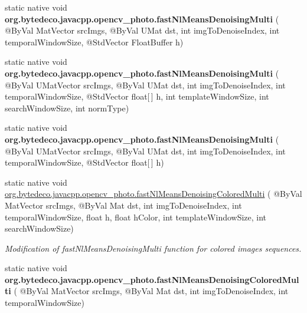 \begin{DoxyCompactItemize}
\item 
\mbox{\label{group__photo__denoise_ga57df66e4f40de8a8d16324a48812dc5b}} 
static native void {\bfseries org.\+bytedeco.\+javacpp.\+opencv\+\_\+photo.\+fast\+Nl\+Means\+Denoising\+Multi} ( @By\+Val Mat\+Vector src\+Imgs, @By\+Val U\+Mat dst, int img\+To\+Denoise\+Index, int temporal\+Window\+Size, @Std\+Vector Float\+Buffer h)
\item 
\mbox{\label{group__photo__denoise_ga8c1f5873e900c7cb05bab2bc1c24648d}} 
static native void {\bfseries org.\+bytedeco.\+javacpp.\+opencv\+\_\+photo.\+fast\+Nl\+Means\+Denoising\+Multi} ( @By\+Val U\+Mat\+Vector src\+Imgs, @By\+Val U\+Mat dst, int img\+To\+Denoise\+Index, int temporal\+Window\+Size, @Std\+Vector float\mbox{[}$\,$\mbox{]} h, int template\+Window\+Size, int search\+Window\+Size, int norm\+Type)
\item 
\mbox{\label{group__photo__denoise_ga6d702df22b56851aeb32c74eaa306449}} 
static native void {\bfseries org.\+bytedeco.\+javacpp.\+opencv\+\_\+photo.\+fast\+Nl\+Means\+Denoising\+Multi} ( @By\+Val U\+Mat\+Vector src\+Imgs, @By\+Val U\+Mat dst, int img\+To\+Denoise\+Index, int temporal\+Window\+Size, @Std\+Vector float\mbox{[}$\,$\mbox{]} h)
\item 
static native void \hyperlink{group__photo__denoise_ga689c12cd97213b5dd69ed55e0971f4b5}{org.\+bytedeco.\+javacpp.\+opencv\+\_\+photo.\+fast\+Nl\+Means\+Denoising\+Colored\+Multi} ( @By\+Val Mat\+Vector src\+Imgs, @By\+Val Mat dst, int img\+To\+Denoise\+Index, int temporal\+Window\+Size, float h, float h\+Color, int template\+Window\+Size, int search\+Window\+Size)
\begin{DoxyCompactList}\small\item\em Modification of fast\+Nl\+Means\+Denoising\+Multi function for colored images sequences. \end{DoxyCompactList}\item 
\mbox{\label{group__photo__denoise_ga5acfa4fb6a6b6f887e680a4dbf6a4132}} 
static native void {\bfseries org.\+bytedeco.\+javacpp.\+opencv\+\_\+photo.\+fast\+Nl\+Means\+Denoising\+Colored\+Multi} ( @By\+Val Mat\+Vector src\+Imgs, @By\+Val Mat dst, int img\+To\+Denoise\+Index, int temporal\+Window\+Size)
\item 
\mbox{\label{group__photo__denoise_ga91c25a31ae3a33ac604d2395c57aa41a}} 

\end{DoxyCompactItemize}

